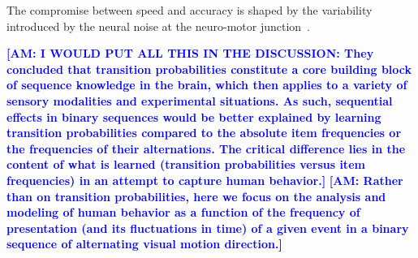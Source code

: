 \documentclass[12pt,english]{article}%
\newcommand{\citep}[1]{\parencite{#1}}
\newcommand{\citet}[1]{\textcite{#1}}
\newcommand{\AM}[1]{\textbf{\textcolor{blue}{[AM: #1]}}}
\begin{document}
%

The compromise between speed and accuracy is shaped
by the variability introduced by the neural noise
at the neuro-motor junction~\citep{Harris98}.




\AM{I WOULD PUT ALL THIS IN THE DISCUSSION: They concluded that transition probabilities constitute
a core building block of sequence knowledge in the brain,
which then applies to a variety of sensory modalities and
experimental situations.
As such, sequential effects in binary sequences would be better explained
by learning transition probabilities
compared to the absolute item frequencies or the frequencies of their alternations.
The critical difference lies in the content
of what is learned (transition probabilities versus item frequencies)
in an attempt to capture human behavior.}
\AM{Rather than on transition probabilities, here we focus on the analysis and modeling of human behavior as a function of the frequency of presentation (and its fluctuations in time) of a given event in a binary sequence of alternating visual motion direction.} 
\end{document}

